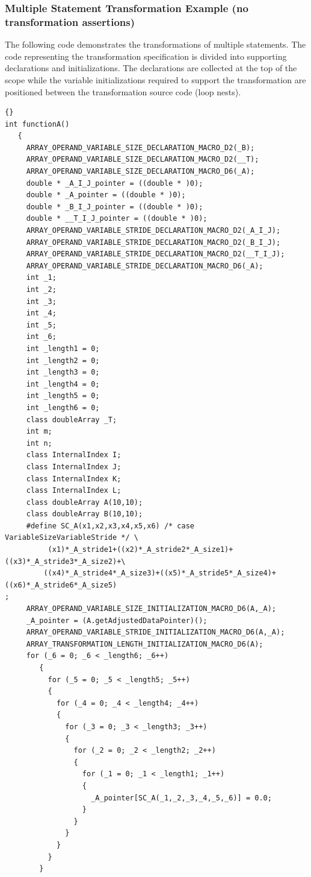 \documentclass[10pt]{article}
\begin{document}
\subsubsection{Multiple Statement Transformation Example (no transformation assertions)}

   The following code demonstrates the transformations of multiple statements.  The code
representing the transformation specification is divided into supporting declarations and
initializations.  The declarations are collected at the top of the scope while the variable
initializations required to support the transformation are positioned between the transformation
source code (loop nests).

\begin{lstlisting}{}
int functionA()
   { 
     ARRAY_OPERAND_VARIABLE_SIZE_DECLARATION_MACRO_D2(_B); 
     ARRAY_OPERAND_VARIABLE_SIZE_DECLARATION_MACRO_D2(__T); 
     ARRAY_OPERAND_VARIABLE_SIZE_DECLARATION_MACRO_D6(_A); 
     double * _A_I_J_pointer = ((double * )0); 
     double * _A_pointer = ((double * )0); 
     double * _B_I_J_pointer = ((double * )0); 
     double * __T_I_J_pointer = ((double * )0); 
     ARRAY_OPERAND_VARIABLE_STRIDE_DECLARATION_MACRO_D2(_A_I_J); 
     ARRAY_OPERAND_VARIABLE_STRIDE_DECLARATION_MACRO_D2(_B_I_J); 
     ARRAY_OPERAND_VARIABLE_STRIDE_DECLARATION_MACRO_D2(__T_I_J); 
     ARRAY_OPERAND_VARIABLE_STRIDE_DECLARATION_MACRO_D6(_A); 
     int _1; 
     int _2; 
     int _3; 
     int _4; 
     int _5; 
     int _6; 
     int _length1 = 0; 
     int _length2 = 0; 
     int _length3 = 0; 
     int _length4 = 0; 
     int _length5 = 0; 
     int _length6 = 0; 
     class doubleArray _T;
     int m;
     int n;
     class InternalIndex I;
     class InternalIndex J;
     class InternalIndex K;
     class InternalIndex L;
     class doubleArray A(10,10);
     class doubleArray B(10,10); 
     #define SC_A(x1,x2,x3,x4,x5,x6) /* case VariableSizeVariableStride */ \
          (x1)*_A_stride1+((x2)*_A_stride2*_A_size1)+((x3)*_A_stride3*_A_size2)+\
         ((x4)*_A_stride4*_A_size3)+((x5)*_A_stride5*_A_size4)+((x6)*_A_stride6*_A_size5)
;
     ARRAY_OPERAND_VARIABLE_SIZE_INITIALIZATION_MACRO_D6(A,_A); 
     _A_pointer = (A.getAdjustedDataPointer)(); 
     ARRAY_OPERAND_VARIABLE_STRIDE_INITIALIZATION_MACRO_D6(A,_A); 
     ARRAY_TRANSFORMATION_LENGTH_INITIALIZATION_MACRO_D6(A); 
     for (_6 = 0; _6 < _length6; _6++)
        { 
          for (_5 = 0; _5 < _length5; _5++)
          { 
            for (_4 = 0; _4 < _length4; _4++)
            { 
              for (_3 = 0; _3 < _length3; _3++)
              { 
                for (_2 = 0; _2 < _length2; _2++)
                { 
                  for (_1 = 0; _1 < _length1; _1++)
                  { 
                    _A_pointer[SC_A(_1,_2,_3,_4,_5,_6)] = 0.0; 
                  } 
                } 
              } 
            } 
          } 
        } 
        

\end{lstlisting}
\end{document}
